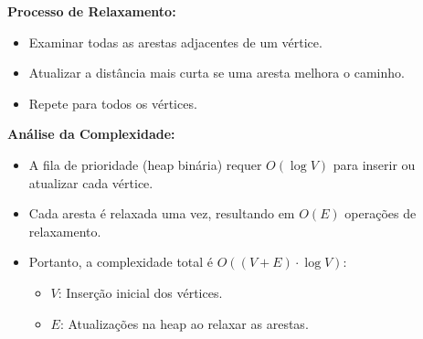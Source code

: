 \documentclass[preview]{standalone}
\begin{document}
\begin{center}
\textbf{Processo de Relaxamento:}
            \begin{itemize}
                \item Examinar todas as arestas adjacentes de um vértice.
                \item Atualizar a distância mais curta se uma aresta melhora o caminho.
                \item Repete para todos os vértices.
            \end{itemize}
            
            \textbf{Análise da Complexidade:}
            \begin{itemize}
                \item A fila de prioridade (heap binária) requer $O(\log V)$ para inserir ou atualizar cada vértice.
                \item Cada aresta é relaxada uma vez, resultando em $O(E)$ operações de relaxamento.
                \item Portanto, a complexidade total é $O((V + E) \cdot \log V)$:
                \begin{itemize}
                    \item $V$: Inserção inicial dos vértices.
                    \item $E$: Atualizações na heap ao relaxar as arestas.
                \end{itemize}
            \end{itemize}
\end{center}
\end{document}
